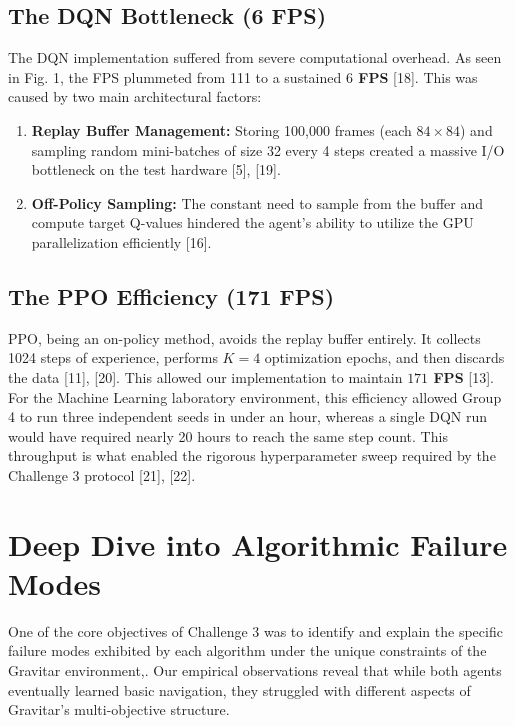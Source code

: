 \documentclass[conference]{IEEEtran}
\begin{document}
\subsection{The DQN Bottleneck (6 FPS)}
The DQN implementation suffered from severe computational overhead.
As seen in Fig. 1, the FPS plummeted from 111 to a sustained \textbf{$6$ FPS} [18].
This was caused by two main architectural factors:
\begin{enumerate}
    \item \textbf{Replay Buffer Management:} Storing 100,000 frames (each $84 \times 84$) and sampling random mini-batches of size 32 every 4 steps created a massive I/O bottleneck on the test hardware [5], [19].
    \item \textbf{Off-Policy Sampling:} The constant need to sample from the buffer and compute target Q-values hindered the agent's ability to utilize the GPU parallelization efficiently [16].
\end{enumerate}

\subsection{The PPO Efficiency (171 FPS)}
PPO, being an on-policy method, avoids the replay buffer entirely.
It collects 1024 steps of experience, performs $K=4$ optimization epochs, and then discards the data [11], [20].
This allowed our implementation to maintain \textbf{$171$ FPS} [13]. For the Machine Learning laboratory environment, this efficiency allowed Group 4 to run three independent seeds in under an hour, whereas a single DQN run would have required nearly 20 hours to reach the same step count.
This throughput is what enabled the rigorous hyperparameter sweep required by the Challenge 3 protocol [21], [22].


\section{Deep Dive into Algorithmic Failure Modes}
One of the core objectives of Challenge 3 was to identify and explain the specific failure modes exhibited by each algorithm under the unique constraints of the Gravitar environment,.
Our empirical observations reveal that while both agents eventually learned basic navigation, they struggled with different aspects of Gravitar's multi-objective structure.
\end{document}
